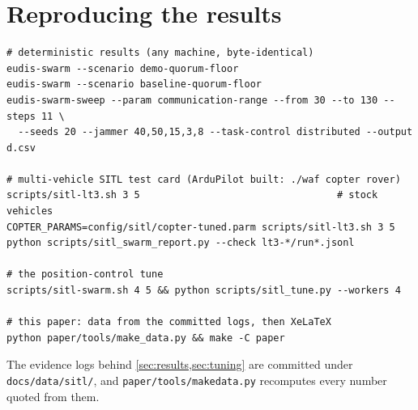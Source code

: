 \documentclass[a4paper,11pt]{article}
\newcommand{\code}[1]{\texttt{\codebreaks#1\endcodebreaks}}
\def\codebreaks{\begingroup\def\_{\textunderscore\allowbreak}\def\/{/\allowbreak}}
\def\endcodebreaks{\endgroup}
\begin{document}
\section{Reproducing the results}\label{app:repro}
\begin{small}
\begin{verbatim}
# deterministic results (any machine, byte-identical)
eudis-swarm --scenario demo-quorum-floor
eudis-swarm --scenario baseline-quorum-floor
eudis-swarm-sweep --param communication-range --from 30 --to 130 --steps 11 \
  --seeds 20 --jammer 40,50,15,3,8 --task-control distributed --output d.csv

# multi-vehicle SITL test card (ArduPilot built: ./waf copter rover)
scripts/sitl-lt3.sh 3 5                                  # stock vehicles
COPTER_PARAMS=config/sitl/copter-tuned.parm scripts/sitl-lt3.sh 3 5
python scripts/sitl_swarm_report.py --check lt3-*/run*.jsonl

# the position-control tune
scripts/sitl-swarm.sh 4 5 && python scripts/sitl_tune.py --workers 4

# this paper: data from the committed logs, then XeLaTeX
python paper/tools/make_data.py && make -C paper
\end{verbatim}
\end{small}
The evidence logs behind \cref{sec:results,sec:tuning} are committed under
\code{docs\/data\/sitl/}, and \code{paper\/tools\/make\_data.py} recomputes every
number quoted from them.
\end{document}
